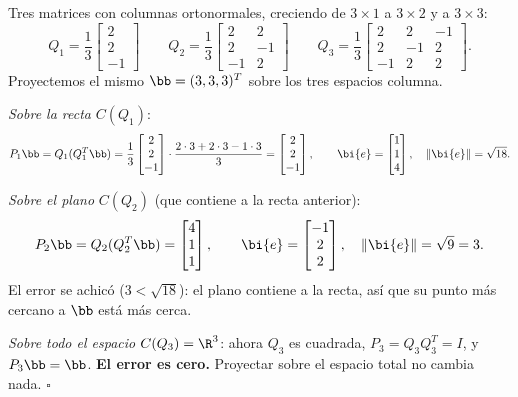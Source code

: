 \begin{ejemplo}\label{ej:proyecciones}
Tres matrices con columnas ortonormales, creciendo de $3\times1$ a
$3\times2$ y a $3\times3$:
\[
Q_1=\frac13\begin{bmatrix}2\\2\\-1\end{bmatrix}\qquad
Q_2=\frac13\begin{bmatrix}2&2\\2&-1\\-1&2\end{bmatrix}\qquad
Q_3=\frac13\begin{bmatrix}2&2&-1\\2&-1&2\\-1&2&2\end{bmatrix}.
\]
Proyectemos el mismo $\bb=(3,3,3)^T$ sobre los tres espacios columna.

\emph{Sobre la recta} $C(Q_1)$:
\[
P_1\bb=Q_1(Q_1^T\bb)
=\frac13\begin{bmatrix}2\\2\\-1\end{bmatrix}
\cdot\frac{2\cdot3+2\cdot3-1\cdot3}{3}
=\begin{bmatrix}2\\2\\-1\end{bmatrix},
\qquad
\bi{e}=\begin{bmatrix}1\\1\\4\end{bmatrix},
\quad \|\bi{e}\|=\sqrt{18}.
\]

\emph{Sobre el plano} $C(Q_2)$ (que contiene a la recta anterior):
\[
P_2\bb=Q_2(Q_2^T\bb)=\begin{bmatrix}4\\1\\1\end{bmatrix},
\qquad
\bi{e}=\begin{bmatrix}-1\\2\\2\end{bmatrix},
\quad \|\bi{e}\|=\sqrt{9}=3 .
\]
El error se achicó ($3<\sqrt{18}$): el plano contiene a la recta, así que su
punto más cercano a $\bb$ está más cerca.

\emph{Sobre todo el espacio} $C(Q_3)=\R^3$: ahora $Q_3$ es cuadrada,
$P_3=Q_3Q_3^T=I$, y $P_3\bb=\bb$. \textbf{El error es cero.} Proyectar
sobre el espacio total no cambia nada. \hfill$\square$
\end{ejemplo}

